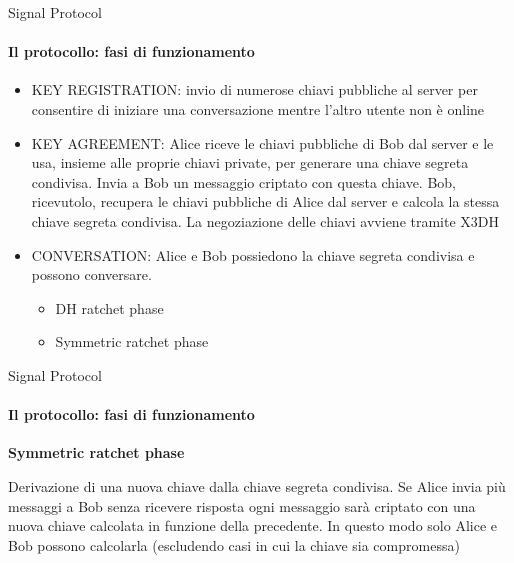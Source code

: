 \begin{frame}{Signal Protocol}
    \framesubtitle{Il protocollo: fasi di funzionamento \cite{VanDam}}
    \begin{itemize}
        \item KEY REGISTRATION: invio di numerose chiavi pubbliche al server per consentire di iniziare una conversazione mentre l'altro utente non è online\pause
        \item KEY AGREEMENT: Alice riceve le chiavi pubbliche di Bob dal server e le usa, insieme alle proprie chiavi private, per generare una chiave segreta condivisa. Invia a Bob un messaggio criptato con questa chiave. Bob, ricevutolo, recupera le chiavi pubbliche di Alice dal server e calcola la stessa chiave segreta condivisa. La negoziazione delle chiavi avviene tramite X3DH\pause
        \item CONVERSATION: Alice e Bob possiedono la chiave segreta condivisa e possono conversare.
                            \begin{itemize}
                                \item DH ratchet phase
                                \item Symmetric ratchet phase                                
                            \end{itemize}
    \end{itemize}

\end{frame}

\begin{frame}{Signal Protocol}
    \framesubtitle{Il protocollo: fasi di funzionamento}
    \textbf{Symmetric ratchet phase}\newline

    Derivazione di una nuova chiave dalla chiave segreta condivisa.\newline\pause
    Se Alice invia più messaggi a Bob senza ricevere risposta ogni messaggio sarà criptato con una nuova chiave calcolata in funzione della precedente.\newline\pause
    In questo modo solo Alice e Bob possono calcolarla (escludendo casi in cui la chiave sia compromessa)
    
\end{frame}

